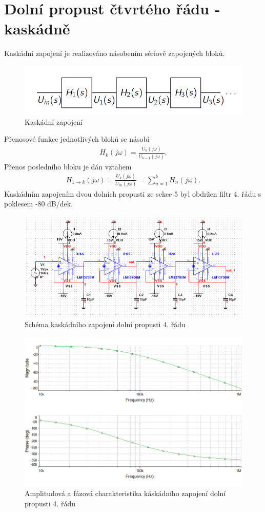 \documentclass[twoside]{article}
\begin{document}
\section{Dolní propust čtvrtého řádu - kaskádně}
Kaskádní zapojení je realizováno násobením sériově zapojených bloků.
\begin{figure}[H]
\centering
\includegraphics[scale=0.4]{schemata.png}
\caption{Kaskádní zapojení \cite{4}}
\end{figure}
Přenosové funkce jednotlivých bloků se násobí
\begin{align}
H_k(j\omega) = \frac{U_k (j\omega)}{U_{k-1}(j\omega)}.
\end{align}
Přenos posledního bloku je dán vztahem
\begin{align}
H_{1 \rightarrow k}(j\omega) = \frac{U_k (j\omega)}{U_{in}(j\omega)} = \sum_{n=1}^{k} H_n(j\omega).
\end{align}
Kaskádním zapojením dvou dolních propusti ze sekce 5 byl obdržen filtr 4. řádu s poklesem -80 dB/dek. 
\begin{figure}[H]
\centering
\includegraphics[scale=0.75]{1506.png}
\caption{Schéma kaskádního zapojení dolní propusti 4. řádu}
\end{figure}
\begin{figure}[H]
\centering
\includegraphics[scale=0.75]{15062.png}
\caption{Amplitudová a fázová charakteristika káskádního zapojení dolní propusti 4. řádu}
\end{figure}
\end{document}
